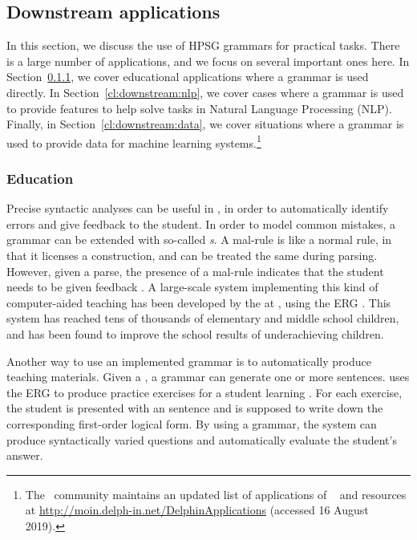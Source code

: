 \documentclass[output=paper
	        ,collection
	        ,collectionchapter
 	        ,biblatex
                ,babelshorthands
                ,newtxmath
                ,draftmode
                ,colorlinks, citecolor=brown
]{langscibook}
\begin{document}
\subsection{Downstream applications}
\label{cl:downstream}


In this section, we discuss
the use of HPSG grammars for practical tasks.
There is a large number of applications,
and we focus on several important ones here.
In Section~\ref{cl:downstream:edu},
we cover educational applications where a grammar is used directly.
In Section~\ref{cl:downstream:nlp},
we cover cases where a grammar is used to provide features
to help solve tasks in Natural Language Processing (NLP).
Finally, in Section~\ref{cl:downstream:data},
we cover situations where a grammar is used to provide data for machine learning systems.\footnote{The \delphin\ community maintains an updated list
of applications of \delphin\  and resources at \url{http://moin.delph-in.net/DelphinApplications} (accessed 16 August 2019).}



\subsubsection{Education}
\label{cl:downstream:edu}


Precise syntactic analyses can be useful in ,
in order to automatically identify errors and give feedback to the student.
In order to model common mistakes,
a grammar can be extended with so-called \textit{s}.
A mal-rule is like a normal rule, in that it licenses a construction,
and can be treated the same during parsing. However, given a parse,
the presence of a mal-rule indicates that the student needs to be given feedback
\citep{Ben:Fli:Oep:04,flickinger2013error,morgadodacosta2016error}.
A large-scale system implementing this kind of computer-aided teaching has been developed
by the  at ,
using the ERG \citep{suppes2014teach}.
This system has reached tens of thousands of elementary and middle school children,
and has been found to improve the school results of underachieving children.

Another way to use an implemented grammar is to automatically produce teaching materials.
Given a ,
a grammar can generate one or more sentences.
\citet{Flickinger:17} uses the ERG to produce practice exercises for a student learning .
For each exercise, the student is presented with an  sentence
and is supposed to write down the corresponding first-order logical form.
By using a grammar, the system can produce syntactically varied questions
and automatically evaluate the student's answer.%
\end{document}
